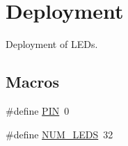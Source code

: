\hypertarget{group__deployment}{}\section{Deployment}
\label{group__deployment}


Deployment of L\+E\+Ds.  


\subsection*{Macros}
\begin{DoxyCompactItemize}
\item 
\#define \hyperlink{group__deployment_gae1a27401b7fb01ccb9a82dbddbb54eea}{P\+IN}~0
\item 
\#define \hyperlink{group__deployment_ga4c4ae9a4146ce8d6a5debc90300d9abd}{N\+U\+M\+\_\+\+L\+E\+DS}~32
\end{DoxyCompactItemize}
